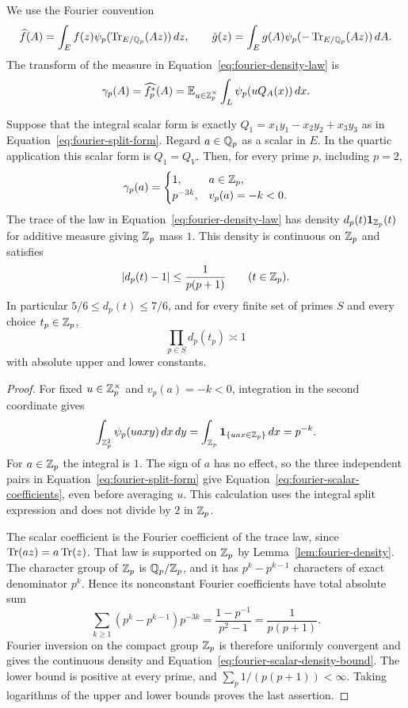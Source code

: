 We use the Fourier convention
\[
 \widehat f(A)=\int_E f(z)\psi_p(\operatorname{Tr}_{E/\mathbb Q_p}(Az))\,dz,
 \qquad
 \check g(z)=\int_E g(A)\psi_p(-\operatorname{Tr}_{E/\mathbb Q_p}(Az))\,dA.
\]
The transform of the measure in Equation~\eqref{eq:fourier-density-law} is
\begin{equation}\label{eq:fourier-gamma}
 \gamma_p(A)=\widehat{f_p^*}(A)
 =\mathbb E_{u\in\mathbb Z_p^\times}\int_L\psi_p(uQ_A(x))\,dx.
\end{equation}

\begin{lemma}\label{lem:fourier-scalar-density}
Suppose that the integral scalar form is exactly
$Q_1=x_1y_1-x_2y_2+x_3y_3$ as in
Equation~\eqref{eq:fourier-split-form}.  Regard $a\in\mathbb Q_p$ as a scalar in
$E$.  In the quartic application this scalar form is $Q_1=Q_V$.  Then, for
every prime $p$, including $p=2$,
\begin{equation}\label{eq:fourier-scalar-coefficients}
 \gamma_p(a)=
 \begin{cases}
 1,&a\in\mathbb Z_p,\\
 p^{-3k},&v_p(a)=-k<0.
 \end{cases}
\end{equation}
The trace of the law in Equation~\eqref{eq:fourier-density-law} has density
$d_p(t)\mathbf1_{\mathbb Z_p}(t)$ for additive measure giving $\mathbb Z_p$ mass $1$.
This density is continuous on $\mathbb Z_p$ and satisfies
\begin{equation}\label{eq:fourier-scalar-density-bound}
 |d_p(t)-1|\le\frac1{p(p+1)}\qquad(t\in\mathbb Z_p).
\end{equation}
In particular $5/6\le d_p(t)\le7/6$, and for every finite set of primes
$S$ and every choice $t_p\in\mathbb Z_p$,
\[
 \prod_{p\in S}d_p(t_p)\asymp1
\]
with absolute upper and lower constants.
\end{lemma}

\begin{proof}
For fixed $u\in\mathbb Z_p^\times$ and $v_p(a)=-k<0$, integration in the second
coordinate gives
\[
 \int_{\mathbb Z_p^2}\psi_p(ua xy)\,dx\,dy
 =\int_{\mathbb Z_p}\mathbf1_{\{ua x\in\mathbb Z_p\}}\,dx=p^{-k}.
\]
For $a\in\mathbb Z_p$ the integral is $1$.  The sign of $a$ has no effect, so the
three independent pairs in Equation~\eqref{eq:fourier-split-form} give
Equation~\eqref{eq:fourier-scalar-coefficients}, even before averaging $u$.
This calculation uses the integral split expression and does not divide by
$2$ in $\mathbb Z_p$.

The scalar coefficient is the Fourier coefficient of the trace law, since
$\operatorname{Tr}(a z)=a\operatorname{Tr}(z)$.  That law is supported on $\mathbb Z_p$ by
Lemma~\ref{lem:fourier-density}.  The character group of $\mathbb Z_p$ is
$\mathbb Q_p/\mathbb Z_p$, and it has $p^k-p^{k-1}$ characters of exact denominator
$p^k$.  Hence its nonconstant Fourier coefficients have total absolute sum
\[
 \sum_{k\ge1}(p^k-p^{k-1})p^{-3k}
       =\frac{1-p^{-1}}{p^2-1}=\frac1{p(p+1)}.
\]
Fourier inversion on the compact group $\mathbb Z_p$ is therefore uniformly
convergent and gives the continuous density and
Equation~\eqref{eq:fourier-scalar-density-bound}.  The lower bound is
positive at every prime, and $\sum_p1/(p(p+1))<\infty$.  Taking logarithms
of the upper and lower bounds proves the last assertion.
\end{proof}

